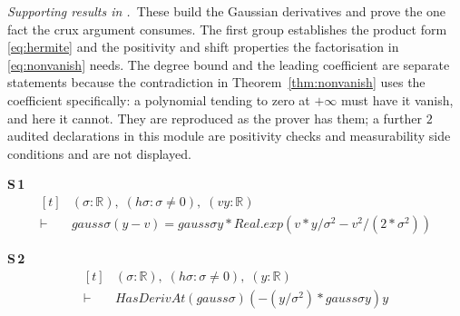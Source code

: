 
\noindent\emph{Supporting results in .}~These build the Gaussian derivatives and prove the one fact the crux argument consumes. The first group establishes the product form \eqref{eq:hermite} and the positivity and shift properties the factorisation in \eqref{eq:nonvanish} needs. The degree bound and the leading coefficient are separate statements because the contradiction in Theorem~\ref{thm:nonvanish} uses the coefficient specifically: a polynomial tending to zero at $+\infty$ must have it vanish, and here it cannot. They are reproduced as the prover has them; a further $2$ audited declarations in this module are positivity checks and measurability side conditions and are not displayed.

\noindent\textbf{S\,1}\quad{}
{\footnotesize\[ \begin{aligned}[t]
&(\sigma : \mathbb{R} ),\; (\mathit{hσ} : \sigma \neq 0),\; (\mathit{v} \mathit{y} : \mathbb{R} )\\
\vdash\;&\mathit{gauss} \sigma (\mathit{y} - \mathit{v}) = \mathit{gauss} \sigma \mathit{y} * \mathit{Real}.\mathit{exp} (\mathit{v} * \mathit{y} / \sigma ^{2} - \mathit{v} ^{2} / (2 * \sigma ^{2}))
\end{aligned} \]}

\noindent\textbf{S\,2}\quad{}
{\footnotesize\[ \begin{aligned}[t]
&(\sigma : \mathbb{R} ),\; (\mathit{hσ} : \sigma \neq 0),\; (\mathit{y} : \mathbb{R} )\\
\vdash\;&\mathit{HasDerivAt} (\mathit{gauss} \sigma ) (-(\mathit{y} / \sigma ^{2}) * \mathit{gauss} \sigma \mathit{y}) \mathit{y}
\end{aligned} \]}

